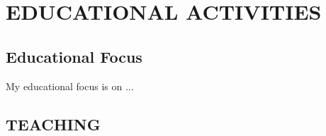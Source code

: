 \documentclass[11pt]{article}
\newcommand{\mylift}[1]{\vspace*{#1}}
\begin{document}

	





\section*{EDUCATIONAL ACTIVITIES} 
\subsection*{Educational Focus}
\mylift{-.5em}
My educational focus is on ...  

\subsection*{TEACHING}
\end{document}
